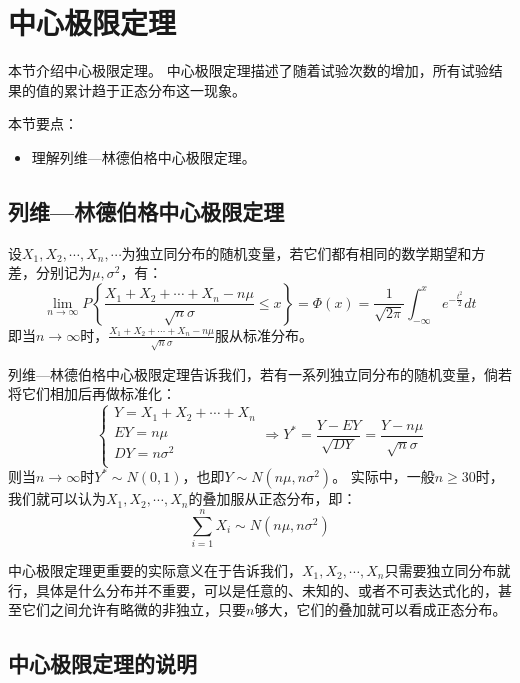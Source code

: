\section{中心极限定理}

本节介绍中心极限定理。
中心极限定理描述了随着试验次数的增加，所有试验结果的值的累计趋于正态分布这一现象。

本节要点：
\begin{itemize}
    \item 理解列维—林德伯格中心极限定理。
\end{itemize}

\subsection{列维—林德伯格中心极限定理}

\begin{theorem}[列维—林德伯格中心极限定理]
设$X_1,X_2,\cdots ,X_n,\cdots $为独立同分布的随机变量，若它们都有相同的数学期望和方差，分别记为$\mu ,\sigma ^2$，有：
\[
\underset{n\rightarrow \infty}{\lim}P\left\{ \frac{X_1+X_2+\cdots +X_n-n\mu}{\sqrt{n}\sigma}\leqslant x \right\} =\varPhi \left( x \right) =\frac{1}{\sqrt{2\pi}}\int_{-\infty}^x{e^{-\frac{t^2}{2}}dt}
\]
即当$n\rightarrow \infty $时，$\frac{X_1+X_2+\cdots +X_n-n\mu}{\sqrt{n}\sigma}$服从标准分布。
\end{theorem}

列维—林德伯格中心极限定理告诉我们，若有一系列独立同分布的随机变量，倘若将它们相加后再做标准化：
\[
\begin{cases}
	Y=X_1+X_2+\cdots +X_n\\
	EY=n\mu\\
	DY=n\sigma ^2\\
\end{cases}\Rightarrow Y^*=\frac{Y-EY}{\sqrt{DY}}=\frac{Y-n\mu}{\sqrt{n}\sigma}
\]
则当$n\rightarrow \infty $时$Y^*\sim N\left( 0,1 \right) $，也即$Y\sim N\left( n\mu ,n\sigma ^2 \right) $。
实际中，一般$n\geqslant 30$时，我们就可以认为$X_1,X_2,\cdots ,X_n$的叠加服从正态分布，即：
\[
\sum_{i=1}^n{X_i}\sim N\left( n\mu ,n\sigma ^2 \right)
\]

中心极限定理更重要的实际意义在于告诉我们，$X_1,X_2,\cdots ,X_n$只需要独立同分布就行，具体是什么分布并不重要，可以是任意的、未知的、或者不可表达式化的，甚至它们之间允许有略微的非独立，只要$n$够大，它们的叠加就可以看成正态分布。

\subsection{中心极限定理的说明}

